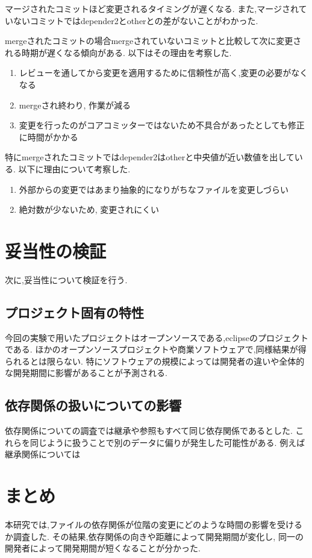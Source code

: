 \documentclass[submit,ses,noauthor]{ipsj} %
\begin{document}
マージされたコミットほど変更されるタイミングが遅くなる.
また,マージされていないコミットではdepender2とotherとの差がないことがわかった.


mergeされたコミットの場合mergeされていないコミットと比較して次に変更される時期が遅くなる傾向がある.
以下はその理由を考察した.
\begin{enumerate}
\item レビューを通してから変更を適用するために信頼性が高く,変更の必要がなくなる
\item mergeされ終わり, 作業が減る
\item 変更を行ったのがコアコミッターではないため不具合があったとしても修正に時間がかかる
\end{enumerate}

特にmergeされたコミットではdepender2はotherと中央値が近い数値を出している.
以下に理由について考察した.

\begin{enumerate}
\item 外部からの変更ではあまり抽象的になりがちなファイルを変更しづらい
\item 絶対数が少ないため, 変更されにくい
\end{enumerate}

\section{妥当性の検証}\label{妥当性の検証}
次に,妥当性について検証を行う.

\subsection{プロジェクト固有の特性}
今回の実験で用いたプロジェクトはオープンソースである,eclipseのプロジェクトである.
ほかのオープンソースプロジェクトや商業ソフトウェアで,同様結果が得られるとは限らない.
特にソフトウェアの規模によっては開発者の違いや全体的な開発期間に影響があることが予測される.

\subsection{依存関係の扱いについての影響}
依存関係についての調査では継承や参照もすべて同じ依存関係であるとした.
これらを同じように扱うことで別のデータに偏りが発生した可能性がある.
例えば継承関係については


\section{まとめ} \label{まとめ}
本研究では,ファイルの依存関係が位階の変更にどのような時間の影響を受けるか調査した.
その結果,依存関係の向きや距離によって開発期間が変化し,
同一の開発者によって開発期間が短くなることが分かった.
\end{document}

